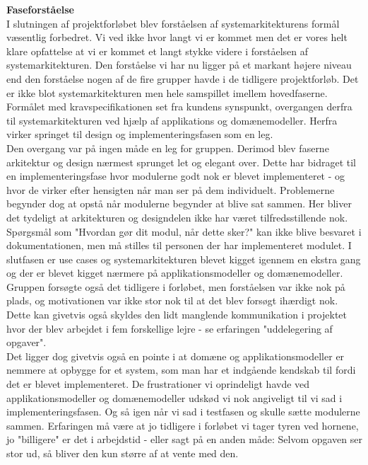 \textbf{Faseforståelse}\\
I slutningen af projektforløbet blev forståelsen af systemarkitekturens formål væsentlig forbedret. Vi ved ikke hvor langt vi er kommet men det er vores helt klare opfattelse at vi er kommet et langt stykke videre i forståelsen af systemarkitekturen. Den forståelse vi har nu ligger på et markant højere niveau end den forståelse nogen af de fire grupper havde i de tidligere projektforløb. Det er ikke blot systemarkitekturen men hele samspillet imellem hovedfaserne. Formålet med kravspecifikationen set fra kundens synspunkt, overgangen derfra til systemarkitekturen ved hjælp af applikations og domænemodeller. Herfra virker springet til design og implementeringsfasen som en leg. \\
Den overgang var på ingen måde en leg for gruppen. Derimod blev faserne arkitektur og design nærmest sprunget let og elegant over. Dette har bidraget til en implementeringsfase hvor modulerne godt nok er blevet implementeret - og hvor de virker efter hensigten når man ser på dem individuelt. Problemerne begynder dog at opstå når modulerne begynder at blive sat sammen. Her bliver det tydeligt at arkitekturen og designdelen ikke har været tilfredsstillende nok. Spørgsmål som "Hvordan gør dit modul, når dette sker?" kan ikke blive besvaret i dokumentationen, men må stilles til personen der har implementeret modulet. I slutfasen er use cases og systemarkitekturen blevet kigget igennem en ekstra gang og der er blevet kigget nærmere på applikationsmodeller og domænemodeller. Gruppen forsøgte også det tidligere i forløbet, men forståelsen var ikke nok på plads, og motivationen var ikke stor nok til at det blev forsøgt ihærdigt nok. Dette kan givetvis også skyldes den lidt manglende kommunikation i projektet hvor der blev arbejdet i fem forskellige lejre - se erfaringen "uddelegering af opgaver".\\
Det ligger dog givetvis også en pointe i at domæne og applikationsmodeller er nemmere at opbygge for et system, som man har et indgående kendskab til fordi det er blevet implementeret. De frustrationer vi oprindeligt havde ved applikationsmodeller og domænemodeller udskød vi nok angiveligt til vi sad i implementeringsfasen. Og så igen når vi sad i testfasen og skulle sætte modulerne sammen. Erfaringen må være at jo tidligere i forløbet vi tager tyren ved hornene, jo "billigere" er det i arbejdstid - eller sagt på en anden måde: Selvom opgaven ser stor ud, så bliver den kun større af at vente med den.\\


